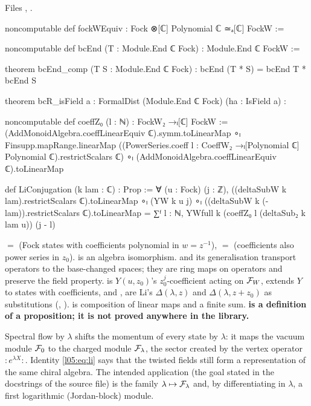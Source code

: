 \noindent Files , .
\begin{leancode}
noncomputable def fockWEquiv : Fock ⊗[ℂ] Polynomial ℂ ≃ₐ[ℂ] FockW :=

noncomputable def bcEnd (T : Module.End ℂ Fock) : Module.End ℂ FockW :=

theorem bcEnd_comp (T S : Module.End ℂ Fock) :
    bcEnd (T * S) = bcEnd T * bcEnd S

theorem bcR_isField {a : FormalDist (Module.End ℂ Fock)} (ha : IsField a) :

noncomputable def coeffZ₀ (l : ℕ) : FockW₂ →ₗ[ℂ] FockW :=
  (AddMonoidAlgebra.coeffLinearEquiv ℂ).symm.toLinearMap ∘ₗ
    Finsupp.mapRange.linearMap
      ((PowerSeries.coeff l : CoeffW₂ →ₗ[Polynomial ℂ] Polynomial ℂ).restrictScalars ℂ) ∘ₗ
    (AddMonoidAlgebra.coeffLinearEquiv ℂ).toLinearMap

def LiConjugation (k lam : ℂ) : Prop :=
  ∀ (u : Fock) (j : ℤ),
    ((deltaSubW k lam).restrictScalars ℂ).toLinearMap ∘ₗ (YW k u j) ∘ₗ
        ((deltaSubW k (-lam)).restrictScalars ℂ).toLinearMap
      = ∑ᶠ l : ℕ, YWfull k (coeffZ₀ l (deltaSub₂ k lam u)) (j - l)
\end{leancode}

\begin{dictionary}
 $=$  (Fock states with coefficients polynomial in $w=z^{-1}$),
 $=$  (coefficients also power series in $z_0$).
 is an algebra isomorphism.  and its generalisation  transport operators to the
base-changed spaces; they are ring maps on operators and preserve the field property.  is
$Y(u,z_0)$'s $z_0^j$-coefficient acting on $\mathcal{F}_W$,  extends $Y$ to states with coefficients, and
,  are Li's $\Delta(\lambda,z)$ and $\Delta(\lambda,z+z_0)$ as substitutions
(, ).  is composition of linear maps and  a finite sum.
\textbf{ is a definition of a proposition; it is not proved anywhere in the library.}
\end{dictionary}

\begin{physics}
Spectral flow by $\lambda$ shifts the momentum of every state by $\lambda$: it maps the vacuum module $\mathcal{F}_0$ to the charged
module $\mathcal{F}_\lambda$, the sector created by the vertex operator ${:}e^{\lambda X}{:}$. Identity \eqref{l05:eq:li} says that the
twisted fields still form a representation of the same chiral algebra. The intended application (the goal stated in the docstrings of
the source file) is the family $\lambda\mapsto\mathcal{F}_\lambda$ and, by differentiating in $\lambda$, a first logarithmic (Jordan-block)
module.
\end{physics}


